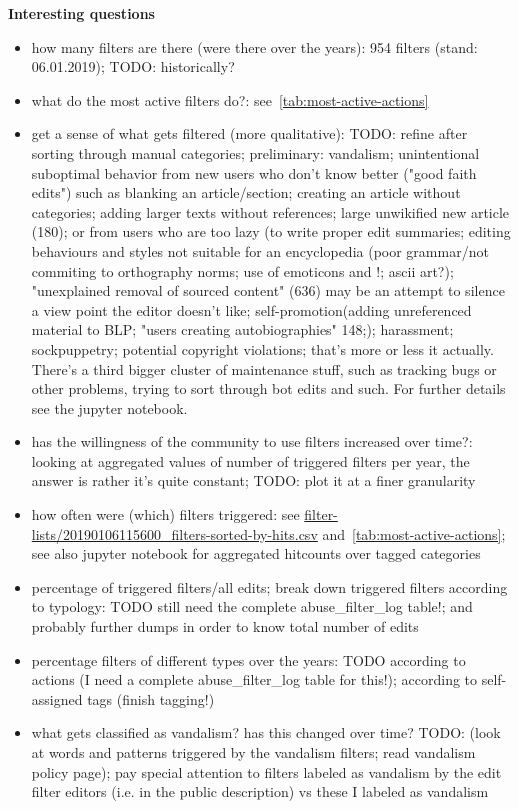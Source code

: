 \documentclass{sigchi}
\begin{document}
\textbf{Interesting questions}
\begin{itemize}
    \item how many filters are there (were there over the years): 954 filters (stand: 06.01.2019); TODO: historically?
    \item what do the most active filters do?: see~\ref{tab:most-active-actions}
    \item get a sense of what gets filtered (more qualitative): TODO: refine after sorting through manual categories; preliminary: vandalism; unintentional suboptimal behavior from new users who don't know better ("good faith edits") such as blanking an article/section; creating an article without categories; adding larger texts without references; large unwikified new article (180); or from users who are too lazy (to write proper edit summaries; editing behaviours and styles not suitable for an encyclopedia (poor grammar/not commiting to orthography norms; use of emoticons and !; ascii art?); "unexplained removal of sourced content" (636) may be an attempt to silence a view point the editor doesn't like; self-promotion(adding unreferenced material to BLP; "users creating autobiographies" 148;); harassment; sockpuppetry; potential copyright violations; that's more or less it actually. There's a third bigger cluster of maintenance stuff, such as tracking bugs or other problems, trying to sort through bot edits and such. For further details see the jupyter notebook.
    \item has the willingness of the community to use filters increased over time?: looking at aggregated values of number of triggered filters per year, the answer is rather it's quite constant; TODO: plot it at a finer granularity
    \item how often were (which) filters triggered: see \url{filter-lists/20190106115600_filters-sorted-by-hits.csv} and~\ref{tab:most-active-actions}; see also jupyter notebook for aggregated hitcounts over tagged categories
    \item percentage of triggered filters/all edits; break down triggered filters according to typology: TODO still need the complete abuse\_filter\_log table!; and probably further dumps in order to know total number of edits
    \item percentage filters of different types over the years: TODO according to actions (I need a complete abuse\_filter\_log table for this!); according to self-assigned tags (finish tagging!)
    \item what gets classified as vandalism? has this changed over time? TODO: (look at words and patterns triggered by the vandalism filters; read vandalism policy page); pay special attention to filters labeled as vandalism by the edit filter editors (i.e. in the public description) vs these I labeled as vandalism
\end{itemize}
\end{document}

